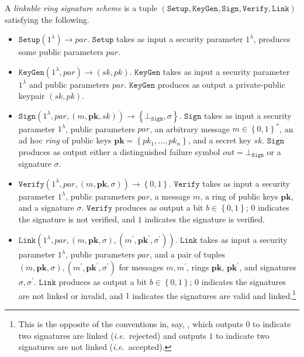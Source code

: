 \documentclass[draft]{llncs} %
\begin{document}
\begin{definition}\label{def:lrs}
A \textit{linkable ring signature scheme} is a tuple $\left(\texttt{Setup}, \texttt{KeyGen}, \right. \allowbreak \left. \texttt{Sign}, \texttt{Verify}, \texttt{Link}\right)$ satisfying the following.
\begin{itemize}
\item $\texttt{Setup}(1^\lambda) \to \textit{par}$. $\texttt{Setup}$ takes as input a security parameter $1^\lambda$, produces some public parameters $\textit{par}$.

\item $\texttt{KeyGen}(1^\lambda, \textit{par}) \to (sk, pk)$. $\texttt{KeyGen}$ takes as input a security parameter $1^\lambda$ and public parameters $\textit{par}$. $\texttt{KeyGen}$ produces as output a private-public keypair $(sk, pk)$.

\item $\texttt{Sign}\left(1^\lambda, \textit{par}, (m, \textbf{pk}, sk)\right) \to \left\{\bot_{\texttt{Sign}}, \sigma \right\}$. $\texttt{Sign}$ takes as input a security parameter $1^\lambda$, public parameters $\textit{par}$, an arbitrary message $m \in \left\{0,1\right\}^*$, an ad hoc \textit{ring} of public keys $\textbf{pk} = \left\{pk_1, \ldots, pk_n\right\}$, and a secret key $sk$. $\texttt{Sign}$ produces as output either a distinguished failure symbol $\textit{out} = \bot_{\texttt{Sign}}$ or a signature $\sigma$.

\item $\texttt{Verify}\left(1^\lambda, \textit{par}, (m, \textbf{pk}, \sigma)\right) \to \left\{0,1\right\}$. $\texttt{Verify}$ takes as input a security parameter $1^\lambda$, public parameters $\textit{par}$, a message $m$, a ring of public keys $\textbf{pk}$, and a signature $\sigma$. $\texttt{Verify}$ produces as output a bit $b \in \left\{0,1\right\}$; $0$ indicates the signature is not verified, and $1$ indicates the signature is verified.

\item $\texttt{Link}\left(1^\lambda, \textit{par}, (m, \textbf{pk}, \sigma), (m^\prime, \textbf{pk}^\prime, \sigma^\prime)\right)$. $\texttt{Link}$ takes as input a security parameter $1^\lambda$, public parameters $\textit{par}$, and a pair of tuples $(m, \textbf{pk}, \sigma), (m^\prime, \textbf{pk}^\prime, \sigma^\prime)$ for messages $m, m^\prime$, rings $\textbf{pk}$, $\textbf{pk}^\prime$, and signatures $\sigma, \sigma^\prime$. $\texttt{Link}$ produces as output a bit $b \in \left\{0,1\right\}$; $0$ indicates the signatures are not linked or invalid, and $1$ indicates the signatures are valid and linked.\footnote{This is the opposite of the conventions in, say, \cite{tsang2004separable}, which outputs $0$ to indicate two signatures are linked (\textit{i.e.}\ rejected) and outputs $1$ to indicate two signatures are not linked (\textit{i.e.}\ accepted).}
\end{itemize}
\end{definition}
\end{document}

